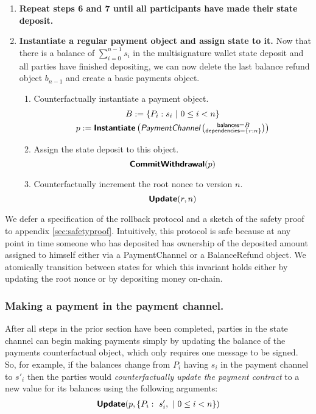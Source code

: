 \documentclass[prb,floatfix,reprint,nofootinbib,amsmath,amssymb,epsfig,pre,floats,letterpaper,groupedaffiliation,tightenlines,allcolors=blue,11pt]{revtex4}
\theoremstyle{definition}
\theoremstyle{definition}
\theoremstyle{definition}
\begin{document}
\begin{enumerate}
\item \textbf{Repeat steps 6 and 7 until all participants have made their state deposit.}

\item \textbf{Instantiate a regular payment object and assign state to it.}
Now that there is a balance of $\sum_{i=0}^{n-1} s_i$ in the multisignature wallet state deposit and all parties have finished depositing, we can now delete the last balance refund object $b_{n-1}$ and create a basic payments object.

\begin{enumerate}

\item Counterfactually instantiate a payment object.
\begin{gather*}
    B := \{P_i:s_i \ |\  0 \le i < n\} \\
    p := \textsf{\textbf{Instantiate}}\left(
    \textit{\textsf{PaymentChannel}}\left(\substack{
    \textsf{balances}=B \\
    \textsf{dependencies}=\left\{r:n\right\}
    }\right)
    \right)
\end{gather*}

\item Assign the state deposit to this object.
\[
\textsf{\textbf{CommitWithdrawal}}(p)
\]

\item Counterfactually increment the root nonce to version $n$.
\[
\textsf{\textbf{Update}}(r, n)
\]

\end{enumerate}

\end{enumerate}

We defer a specification of the rollback protocol and a sketch of the safety proof to appendix \ref{sec:safetyproof}. Intuitively, this protocol is safe because at any point in time someone who has deposited has ownership of the deposited amount assigned to himself either via a PaymentChannel or a BalanceRefund object. We atomically transition between states for which this invariant holds either by updating the root nonce or by depositing money on-chain.

\subsubsection{Making a payment in the payment channel.}
After all steps in the prior section have been completed, parties in the state channel can begin making payments simply by updating the balance of the payments counterfactual object, which only requires one message to be signed. So, for example, if the balances change from $P_i$ having $s_i$ in the payment channel to $s'_i$ then the parties would \textit{counterfactually update the payment contract} to a new value for its \textsf{balances} using the following arguments:
\begin{gather*}
    \textsf{\textbf{Update}}(p, \{P_i:\ s'_i, \ |\  0 \le i < n \} )
\end{gather*}
\end{document}

